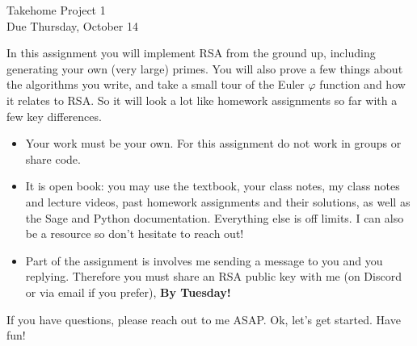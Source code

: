 \documentclass[11pt]{article}
\begin{document}
\begin{center}
\Large {Takehome Project 1}\\
\small {Due Thursday, October 14}
\end{center}
In this assignment you will implement RSA from the ground up, including generating your own (very large) primes.  You will also prove a few things about the algorithms you write, and take a small tour of the Euler $\varphi$ function and how it relates to RSA.  So it will look a lot like homework assignments so far with a few key differences.
\begin{itemize}
  \item{Your work must be your own.  For this assignment do not work in groups or share code.}
  \item{It is open book: you may use the textbook, your class notes, my class notes and lecture videos, past homework assignments and their solutions, as well as the Sage and Python documentation.  Everything else is off limits.  I can also be a resource so don't hesitate to reach out!}
  \item{Part of the assignment is involves me sending a message to you and you replying.  Therefore you must share an RSA public key with me (on Discord or via email if you prefer), \textbf{By Tuesday!}}
\end{itemize}
If you have questions, please reach out to me ASAP.  Ok, let's get started.  Have fun!
\end{document}
